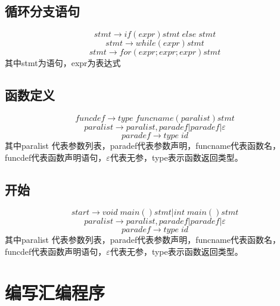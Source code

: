 \documentclass[lang=cn,11pt]{elegantpaper}
\begin{document}
\setcounter{equation}{0}
\subsection{循环分支语句}
\begin{equation}
  stmt \to if(expr)stmt \; else\; stmt
\end{equation}
\begin{equation}
  stmt \to while(expr) stmt
\end{equation}
 \begin{equation}
  stmt \to for (expr;expr;expr)stmt
 \end{equation}
 其中stmt为语句，expr为表达式

\setcounter{equation}{0}
\subsection{函数定义}
\begin{equation}
  funcdef \to type \; funcname(paralist)stmt
\end{equation}
\begin{equation}
  paralist\to paralist,paradef|paradef|\varepsilon 
\end{equation}
 \begin{equation}
 paradef\to type \; id
 \end{equation}
其中paralist 代表参数列表，paradef代表参数声明，funcname代表函数名，funcdef代表函数声明语句，$\varepsilon$代表无参，type表示函数返回类型。

\setcounter{equation}{0}
\subsection{开始}
\begin{equation}
 start\to void \;main(){stmt}|int\;main(){stmt}
\end{equation}
\begin{equation}
  paralist\to paralist,paradef|paradef|\varepsilon 
\end{equation}
 \begin{equation}
 paradef\to type \; id
 \end{equation}
其中paralist 代表参数列表，paradef代表参数声明，funcname代表函数名，funcdef代表函数声明语句，$\varepsilon$代表无参，type表示函数返回类型。

\section{编写汇编程序}
\end{document}
